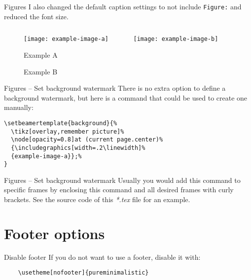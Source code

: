 \documentclass[aspectratio=169]{beamer}
\begin{document}
\begin{frame}{Figures}
  I also changed the default caption settings to not 
  include \texttt{Figure:} and reduced the font size.
    \begin{figure}[H]
        \centering
        \begin{columns}[T]
            \begin{column}{.3\linewidth}
                \texttt{[image: example-image-a]}
                \caption{Example A}
            \end{column}
            \begin{column}{.3\linewidth}
                \texttt{[image: example-image-b]}
                \caption{Example B}
            \end{column}
        \end{columns}
    \end{figure}
\end{frame}

\begin{frame}[fragile]{Figures -- Set background watermark}
  There is no extra option to define a background watermark, but here
  is a command that could be used to create one manually:
  \vfill
  \begin{verbatim}
\setbeamertemplate{background}{%
  \tikz[overlay,remember picture]%
  \node[opacity=0.8]at (current page.center)%
  {\includegraphics[width=.2\linewidth]%
  {example-image-a}};%
}
  \end{verbatim}
\end{frame}

{
\begin{frame}{Figures -- Set background watermark}
  Usually you would add this command to specific
  frames by enclosing this command and all desired frames with
  curly brackets.
  \vfill
  See the source code of this \emph{*.tex} file for an
  example.
\end{frame}
}


\section{Footer options}
\begin{frame}[fragile]{Disable footer}
  If you do not want to use a footer, disable it with:
  \begin{verbatim}
    \usetheme[nofooter]{pureminimalistic}
  \end{verbatim}
\end{frame}
\end{document}
